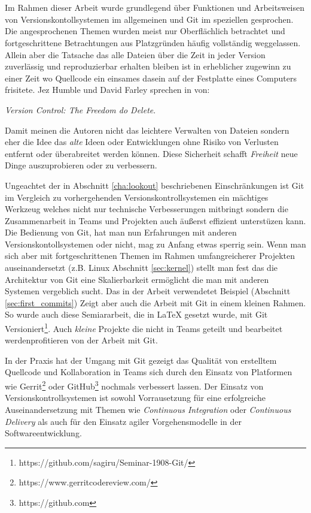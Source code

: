 \chapter{\result}\label{cha:result}
Im Rahmen dieser Arbeit wurde grundlegend über Funktionen und Arbeitsweisen von
Versionskontollsystemen im allgemeinen und Git im speziellen gesprochen. Die
angesprochenen Themen wurden meist nur Oberflächlich betrachtet und
fortgeschrittene Betrachtungen aus Platzgründen häufig vollständig weggelassen.
Allein aber die Tatsache das alle Dateien über die Zeit in jeder Version
zuverlässig und reproduzierbar erhalten bleiben ist in erheblicher zugewinn zu
einer Zeit wo Quellcode ein einsames dasein auf der Festplatte eines Computers
frisitete. Jez Humble und David Farley sprechen in \cite[S.~35]{cd} von:

\begin{center}
\textit{\glqq{}Version Control: The Freedom do Delete}.
\end{center}

Damit meinen die Autoren nicht das leichtere Verwalten von Dateien sondern eher
die Idee das \textit{alte} Ideen oder Entwicklungen ohne Risiko von Verlusten
entfernt oder überabreitet werden können. Diese Sicherheit schafft
\textit{Freiheit} neue Dinge auszuprobieren oder zu verbessern.

Ungeachtet der in Abschnitt \ref{cha:lookout} beschriebenen Einschränkungen ist
Git im Vergleich zu vorhergehenden Versionskontrollsystemen ein mächtiges
Werkzeug welches nicht nur technische Verbesserungen mitbringt sondern die
Zusammenarbeit in Teams und Projekten auch äußerst effizient unterstüzen kann.
Die Bedienung von Git, hat man nun Erfahrungen mit anderen
Versionskontollsystemen oder nicht, mag zu Anfang etwas sperrig sein.  Wenn man
sich aber mit fortgeschrittenen Themen im Rahmen umfangreicherer Projekten
auseinandersetzt (z.B. Linux Abschnitt \ref{sec:kernel}) stellt man fest das
die Architektur von Git eine Skalierbarkeit ermöglicht die man mit anderen
Systemen vergeblich sucht. Das in der Arbeit verwendetet Beispiel (Abschnitt
\ref{sec:first_commits}) Zeigt aber auch die Arbeit mit Git in einem kleinen
Rahmen. So wurde auch diese Semiararbeit, die in LaTeX gesetzt wurde, mit Git
Versioniert\footnote{https://github.com/sagiru/Seminar-1908-Git/}. Auch
\textit{kleine} Projekte die nicht in Teams geteilt und bearbeitet
werdenprofitieren von der Arbeit mit Git.

In der Praxis hat der Umgang mit Git gezeigt das Qualität von erstelltem
Quellcode und Kollaboration in Teams sich durch den Einsatz von Platformen wie
Gerrit\footnote{https://www.gerritcodereview.com/} oder
GitHub\footnote{https://github.com} nochmals verbessert lassen. Der Einsatz von
Versionskontrollsystemen ist sowohl Vorrausetzung für eine erfolgreiche
Auseinandersetzung mit Themen wie \textit{Continuous Integration} oder
\textit{Continuous Delivery} als auch für den Einsatz agiler Vorgehensmodelle
in der Softwareentwicklung.\cite{cd}

